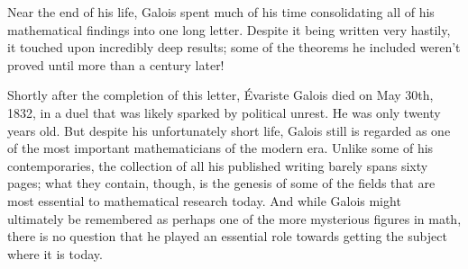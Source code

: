 \documentclass{article}
\begin{document}
Near the end of his life, Galois spent much of his time consolidating all of his mathematical findings into one long letter. Despite it being written very hastily, it touched upon incredibly deep results; some of the theorems he included weren’t proved until more than a century later! 

Shortly after the completion of this letter, Évariste Galois died on May 30th, 1832, in a duel that was likely sparked by political unrest. He was only twenty years old. But despite his unfortunately short life, Galois still is regarded as one of the most important mathematicians of the modern era. Unlike some of his contemporaries, the collection of all his published writing barely spans sixty pages; what they contain, though, is the genesis of some of the fields that are most essential to mathematical research today. And while Galois might ultimately be remembered as perhaps one of the more mysterious figures in math, there is no question that he played an essential role towards getting the subject where it is today. 
\end{document}
